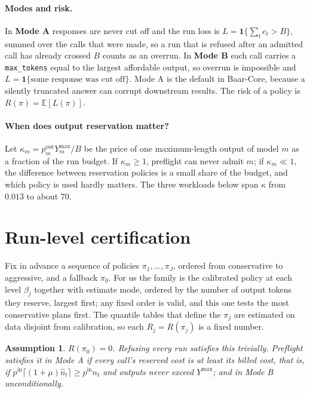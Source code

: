 \documentclass[11pt]{article}
\newtheorem{assumption}{Assumption}
\theoremstyle{remark}
\begin{document}
\paragraph{Modes and risk.}
In \textbf{Mode A} responses are never cut off and the run loss is
$L = \mathbf 1\{\sum_t c_t > B\}$, summed over the calls that were made, so a run
that is refused after an admitted call has already crossed $B$ counts as an
overrun. In \textbf{Mode B} each call carries a
\texttt{max\_tokens} equal to the largest affordable output, so overrun is
impossible and $L = \mathbf 1\{\text{some response was cut off}\}$. Mode A is
the default in Baar-Core, because a silently truncated answer can corrupt
downstream results. The risk of a policy is $R(\pi) = \mathbb E[L(\pi)]$.

\paragraph{When does output reservation matter?}
Let $\kappa_m = p^{\text{out}}_m Y^{\max}_m / B$ be the price of one
maximum-length output of model $m$ as a fraction of the run budget. If
$\kappa_m \ge 1$, preflight can never admit $m$; if $\kappa_m \ll 1$, the
difference between reservation policies is a small share of the budget, and
which policy is used hardly matters. The three workloads below span
$\kappa$ from $0.013$ to about $70$.

\section{Run-level certification}\label{sec:method}

Fix in advance a sequence of policies $\pi_1, \dots, \pi_J$, ordered from
conservative to aggressive, and a fallback $\pi_0$. For us the family is the
calibrated policy at each level $\beta_j$ together with estimate mode, ordered
by the number of output tokens they reserve, largest first; any fixed order is
valid, and this one tests the most conservative plans first. The
quantile tables that define the $\pi_j$ are estimated on data disjoint from
calibration, so each $R_j = R(\pi_j)$ is a fixed number.

\begin{assumption}\label{ass:fallback}
$R(\pi_0) = 0$. Refusing every run satisfies this trivially. Preflight
satisfies it in Mode A if every call's reserved cost is at least its billed
cost, that is, if $p^{\text{in}}\lceil(1+\mu)\hat n_t\rceil \ge p^{\text{in}} n_t$
and outputs never exceed $Y^{\max}$; and in Mode B unconditionally.
\end{assumption}
\end{document}
